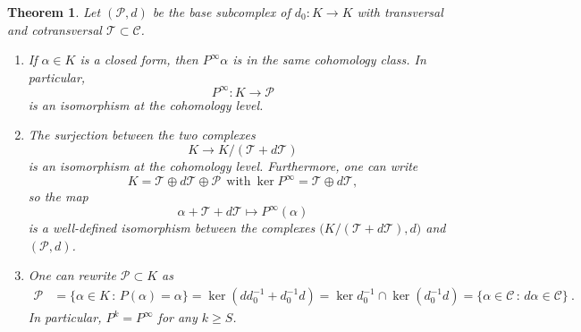 \documentclass[10pt]{amsart}
\newcounter{dummy} \numberwithin{dummy}{section}
\newtheorem{theorem}[dummy]{Theorem}
\theoremstyle{remark}
\newcommand{\calP}{\mathcal{P}}
\newcommand{\calT}{\mathcal{T}}
\newcommand{\calC}{\mathcal{C}}
\numberwithin{equation}{section}
\begin{document}
\begin{theorem} \label{th:SetUp} Let $(\mathcal{P},d)$ be the base subcomplex of $d_0\colon K\to K$ with transversal and cotransversal $\mathcal{T}\subset\mathcal{C}$.
\begin{enumerate}[\rm (a)]

\item If $\alpha\in K$ is a closed form, then $P^\infty \alpha$ is in the same cohomology class. In particular,
$$P^\infty: K \to \calP$$
is an isomorphism at the cohomology level.
\item The surjection between the two complexes 
$$K \to K/(\calT + d\calT)$$
is an isomorphism at the cohomology level. Furthermore, one can write
$$K = \calT \oplus d\calT \oplus \calP\  \  \text{with} \  \ker P^\infty = \calT \oplus d \calT,$$
so the map
$$\alpha + \calT + d\calT \longmapsto P^\infty(\alpha)$$
is a well-defined isomorphism between the complexes $\big(K/(\calT+ d\calT),d\big)$ and $(\calP,d)$.
\item One can rewrite $\mathcal{P}\subset K$ as
\begin{align*}
    \calP &= \{ \alpha \in K \, : \, P(\alpha) = \alpha \} = \ker (dd_0^{-1} + d_0^{-1} d) = \ker d_0^{-1} \cap \ker (d_0^{-1} d) = \{ \alpha \in \calC \, : \, d \alpha  \in \calC \}\ .
\end{align*}
In particular, $P^k = P^\infty$ for any $k \geq S$.  
\end{enumerate}
\end{theorem}
\end{document}
